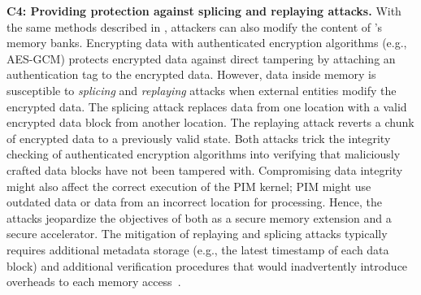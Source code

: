 \textbf{C4: Providing protection against splicing and replaying attacks.} \label{c4}
With the same methods described in , attackers can also modify the content of \baseline's memory banks.
Encrypting data with authenticated encryption algorithms (e.g., AES-GCM) protects encrypted data against direct tampering by attaching an authentication tag to the encrypted data. However, data inside memory is susceptible to \emph{splicing} and \emph{replaying} attacks when external entities modify the encrypted data. The splicing attack replaces data from one location with a valid encrypted data block from another location. The replaying attack reverts a chunk of encrypted data to a previously valid state. Both attacks trick the integrity checking of authenticated encryption algorithms into verifying that maliciously crafted data blocks have not been tampered with. Compromising data integrity might also affect the correct execution of the PIM kernel; PIM might use outdated data or data from an incorrect location for processing. Hence, the attacks jeopardize the objectives of \thename both as a secure memory extension and a secure accelerator. The mitigation of replaying and splicing attacks typically requires additional metadata storage (e.g., the latest timestamp of each data block) and additional verification procedures that would inadvertently introduce overheads to each memory access~\cite{bonsaimerkletree,common-counter}. 

